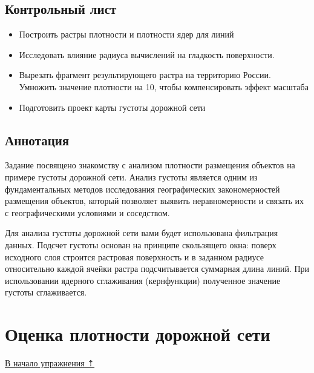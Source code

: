 \documentclass[]{book}
\providecommand{\tightlist}{%
  \setlength{\itemsep}{0pt}\setlength{\parskip}{0pt}}
\theoremstyle{definition}
\theoremstyle{definition}
\theoremstyle{definition}
\theoremstyle{remark}
\begin{document}
\hypertarget{density-analysis-control}{%
\subsection{Контрольный лист}\label{density-analysis-control}}

\begin{itemize}
\tightlist
\item
  Построить растры плотности и плотности ядер для линий
\item
  Исследовать влияние радиуса вычислений на гладкость поверхности.
\item
  Вырезать фрагмент результирующего растра на территорию России.
  Умножить значение плотности на 10, чтобы компенсировать эффект
  масштаба
\item
  Подготовить проект карты густоты дорожной сети
\end{itemize}

\hypertarget{density-analysis-annotation}{%
\subsection{Аннотация}\label{density-analysis-annotation}}

Задание посвящено знакомству с анализом плотности размещения объектов на
примере густоты дорожной сети. Анализ густоты является одним из
фундаментальных методов исследования географических закономерностей
размещения объектов, который позволяет выявить неравномерности и связать
их с географическими условиями и соседством.

Для анализа густоты дорожной сети вами будет использована фильтрация
данных. Подсчет густоты основан на принципе скользящего окна: поверх
исходного слоя строится растровая поверхность и в заданном радиусе
относительно каждой ячейки растра подсчитывается суммарная длина линий.
При использовании ядерного сглаживания (кернфункции) полученное значение
густоты сглаживается.

\hypertarget{density-analysis-estimation}{%
\section{Оценка плотности дорожной
сети}\label{density-analysis-estimation}}

\protect\hyperlink{density-analysis}{В начало упражнения ⇡}
\end{document}
